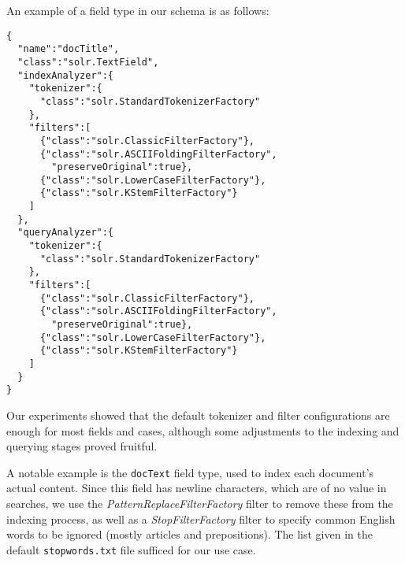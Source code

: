 \documentclass[sigconf, authorversion]{acmart}
\begin{document}
An example of a field type in our schema is as follows:

\begin{lstlisting}[caption={Field type \texttt{docTitle}}]
{
  "name":"docTitle",
  "class":"solr.TextField",
  "indexAnalyzer":{
    "tokenizer":{
      "class":"solr.StandardTokenizerFactory"
    },
    "filters":[
      {"class":"solr.ClassicFilterFactory"},
      {"class":"solr.ASCIIFoldingFilterFactory",
        "preserveOriginal":true},
      {"class":"solr.LowerCaseFilterFactory"},
      {"class":"solr.KStemFilterFactory"}
    ]
  },
  "queryAnalyzer":{
    "tokenizer":{
      "class":"solr.StandardTokenizerFactory"
    },
    "filters":[
      {"class":"solr.ClassicFilterFactory"},
      {"class":"solr.ASCIIFoldingFilterFactory",
        "preserveOriginal":true},
      {"class":"solr.LowerCaseFilterFactory"},
      {"class":"solr.KStemFilterFactory"}
    ]
  }
}
\end{lstlisting}


Our experiments showed that the default tokenizer and filter configurations are enough for most fields and cases, although some adjustments to the indexing and querying stages proved fruitful. 

A notable example is the \texttt{docText} field type, used to index each document's actual content.
Since this field has newline characters, which are of no value in searches, we use the \textit{PatternReplaceFilterFactory} filter to remove these from the indexing process, as well as a \textit{StopFilterFactory} filter to specify common English words to be ignored (mostly articles and prepositions). The list given in the default \texttt{stopwords.txt} file sufficed for our use case.
\end{document}
